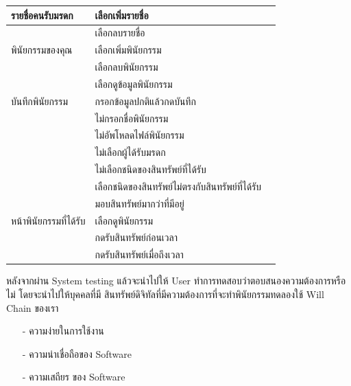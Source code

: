 \documentclass[12pt,oneside,openright,a4paper]{cpe-thai-project}
\begin{document}
\begin{enumerate}[label=\thesection.\arabic*,leftmargin=0pt,itemindent=1.25cm]
\begin{table}[h]
\begin{tabular}{|l|l|l|}
รายชื่อคนรับมรดก       & เลือกเพิ่มรายชื่อ                                &        \\ \hline
                       & เลือกลบรายชื่อ                                   &        \\ \hline
พินัยกรรมของคุณ        & เลือกเพิ่มพินัยกรรม                              &        \\ \hline
                       & เลือกลบพินัยกรรม                                 &        \\ \hline
                       & เลือกดูข้อมูลพินัยกรรม                           &        \\ \hline
บันทึกพินัยกรรม        & กรอกข้อมูลปกติแล้วกดบันทึก                      &        \\ \hline
                       & ไม่กรอกชื่อพินัยกรรม                             &        \\ \hline
                       & ไม่อัพโหลดไฟล์พินัยกรรม                        &        \\ \hline
                       & ไม่เลือกผู้ได้รับมรดก                            &        \\ \hline
                       & ไม่เลือกชนิดของสินทรัพย์ที่ได้รับ                &        \\ \hline
                       & เลือกชนิดของสินทรัพย์ไม่ตรงกับสินทรัพย์ที่ได้รับ &        \\ \hline
                       & มอบสินทรัพย์มากว่าที่มีอยู่                      &        \\ \hline
หน้าพินัยกรรมที่ได้รับ & เลือกดูพินัยกรรม                                 &        \\ \hline
                       & กดรับสินทรัพย์ก่อนเวลา                           &        \\ \hline
                       & กดรับสินทรัพย์เมื่อถึงเวลา                       &        \\ \hline
\end{tabular}
\end{table}
\end{enumerate}

\tab หลังจากผ่าน System testing แล้วจะนำไปให้ User ทำการทดสอบว่าตอบสนองความต้องการหรือไม่ โดยจะนำไปให้บุคคลที่มี สินทรัพย์ดิจิทัลที่มีความต้องการที่จะทำพินัยกรรมทดลองใช้ Will Chain ของเรา

\begin{itemize}
	\item[-] ความง่ายในการใช้งาน
	\item[-]  ความน่าเชื่อถือของ Software
	\item[-]  ความเสถียร ของ Software
\end{itemize}
\end{document}
